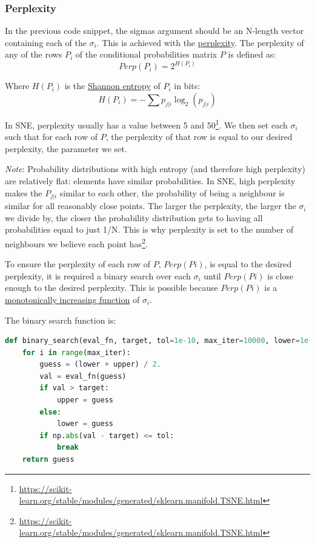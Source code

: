\subsubsection{Perplexity}
In the previous code snippet, the sigmas argument should be an N-length vector containing each of the $\sigma_i$. This is achieved with the \hyperlink{https://en.wikipedia.org/wiki/Perplexity}{perplexity}. The perplexity of any of the rows $P_i$ of the conditional probabilities matrix $P$ is defined as:
$$ Perp(P_i) = 2^{H(P_i)}$$

Where $H(P_i)$ is the \href{https://en.wiktionary.org/wiki/Shannon_entropy}{Shannon entropy} of $P_i$ in bits:
$$ H(P_i) = - \sum p_{j|i} \log_2 (p_{j|i}) $$

In SNE, perplexity usually has a value between 5 and 50\footnote{\url{https://scikit-learn.org/stable/modules/generated/sklearn.manifold.TSNE.html}}. We then set each $\sigma_i$ such that for each row of $P$, the perplexity of that row is equal to our desired perplexity, the parameter we set.

\emph{Note}: Probability distributions with high entropy (and therefore high perplexity) are relatively flat: elements have similar probabilities. In SNE, high perplexity makes the $P_{j|i}$ similar to each other, the probability of being a neighbour is similar for all reasonably close points. The larger the perplexity, the larger the $\sigma_i$ we divide by, the closer the probability distribution gets to having all probabilities equal to just 1/N. This is why perplexity is set to the number of neighbours we believe each point has\footnote{\url{https://scikit-learn.org/stable/modules/generated/sklearn.manifold.TSNE.html}}.

To ensure the perplexity of each row of $P$, $Perp(Pi)$, is equal to the desired perplexity, it is required a binary search over each $\sigma_i$ until $Perp(Pi)$ is close enough to the desired perplexity. This is possible because $Perp(Pi)$ is a \hyperlink{https://en.wikipedia.org/wiki/Monotonic_function}{monotonically increasing function} of $\sigma_i$.

The binary search function is:
\begin{lstlisting}[language=Python]
def binary_search(eval_fn, target, tol=1e-10, max_iter=10000, lower=1e-20, upper=1000.):
    for i in range(max_iter):
        guess = (lower + upper) / 2.
        val = eval_fn(guess)
        if val > target:
            upper = guess
        else:
            lower = guess
        if np.abs(val - target) <= tol:
            break
    return guess
\end{lstlisting}

